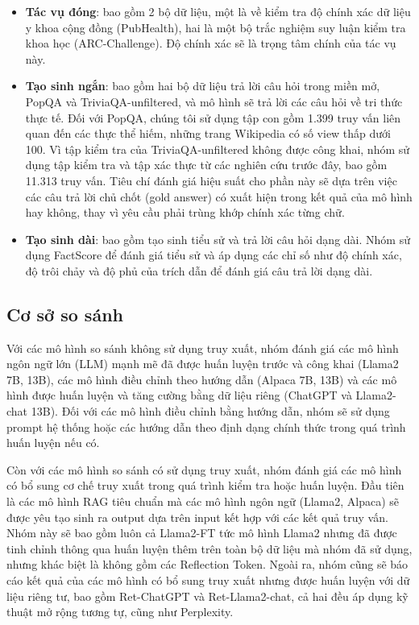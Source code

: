 \documentclass{article}
\begin{document}
\begin{itemize}
    \item \textbf{Tác vụ đóng}: bao gồm 2 bộ dữ liệu, một là về kiểm tra độ chính xác dữ liệu y khoa cộng đồng (PubHealth), hai là một bộ trắc nghiệm suy luận kiểm tra khoa học (ARC-Challenge). Độ chính xác sẽ là trọng tâm chính của tác vụ này. 
    \item \textbf{Tạo sinh ngắn}: bao gồm hai bộ dữ liệu trả lời câu hỏi trong miền mở, PopQA và TriviaQA-unfiltered, và mô hình sẽ trả lời các câu hỏi về tri thức thực tế. Đối với PopQA, chúng tôi sử dụng tập con gồm 1.399 truy vấn liên quan đến các thực thể hiếm, những trang Wikipedia có số view thấp dưới 100. Vì tập kiểm tra của TriviaQA-unfiltered không được công khai, nhóm sử dụng tập kiểm tra và tập xác thực từ các nghiên cứu trước đây, bao gồm 11.313 truy vấn. Tiêu chí đánh giá hiệu suất cho phần này sẽ dựa trên việc các câu trả lời chủ chốt (gold answer) có xuất hiện trong kết quả của mô hình hay không, thay vì yêu cầu phải trùng khớp chính xác từng chữ.
    \item \textbf{Tạo sinh dài}: bao gồm tạo sinh tiểu sử và trả lời câu hỏi dạng dài. Nhóm sử dụng FactScore để đánh giá tiểu sử và áp dụng các chỉ số như độ chính xác, độ trôi chảy và độ phủ của trích dẫn để đánh giá câu trả lời dạng dài.
\end{itemize}

\subsection{Cơ sở so sánh}
Với các mô hình so sánh không sử dụng truy xuất, nhóm đánh giá các mô hình ngôn ngữ lớn (LLM) mạnh mẽ đã được huấn luyện trước và công khai (Llama2 7B, 13B), các mô hình điều chỉnh theo hướng dẫn (Alpaca 7B, 13B) và các mô hình được huấn luyện và tăng cường bằng dữ liệu riêng (ChatGPT và Llama2-chat 13B). Đối với các mô hình điều chỉnh bằng hướng dẫn, nhóm sẽ sử dụng prompt hệ thống hoặc các hướng dẫn theo định dạng chính thức trong quá trình huấn luyện nếu có.

Còn với các mô hình so sánh có sử dụng truy xuất, nhóm đánh giá các mô hình có bổ sung cơ chế truy xuất trong quá trình kiểm tra hoặc huấn luyện. Đầu tiên là các mô hình RAG tiêu chuẩn mà các mô hình ngôn ngữ (Llama2, Alpaca) sẽ được yêu tạo sinh ra output dựa trên input kết hợp với các kết quả truy vấn. Nhóm này sẽ bao gồm luôn cả Llama2-FT tức mô hình Llama2 nhưng đã được tinh chỉnh thông qua huấn luyện thêm trên toàn bộ dữ liệu mà nhóm đã sử dụng, nhưng khác biệt là không gồm các Reflection Token. Ngoài ra, nhóm cũng sẽ báo cáo kết quả của các mô hình có bổ sung truy xuất nhưng được huấn luyện với dữ liệu riêng tư, bao gồm Ret-ChatGPT và Ret-Llama2-chat, cả hai đều áp dụng kỹ thuật mở rộng tương tự, cũng như Perplexity. 
\end{document}
